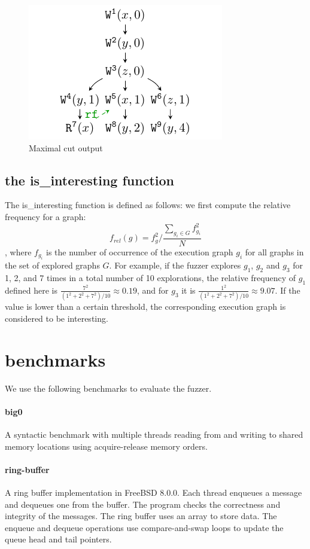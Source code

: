 \begin{figure}[htbp] 
	\centering
	\includegraphics[scale=1]{figure/cuts/cut-maximal.pdf} 
	\caption{Maximal cut output} 
	\label{cut:maximal} 
\end{figure} 


\subsection{the is\_interesting function}
The is\_interesting function is defined as follows: we first compute the relative frequency for a graph:
\[f_{rel}(g) = f_g^2 / \frac{\sum_{g_i \in G} f_{g_i}^2}{N}\], where $f_{g_i}$ is the number of occurrence of the execution graph $g_i$ for all graphs in the set of explored graphs $G$. For example, if the fuzzer explores $g_1$, $g_2$ and $g_3$ for 1, 2, and 7 times in a total number of 10 explorations, the relative frequency of $g_1$ defined here is $\frac{7^2}{(1^2 + 2^2 + 7^2) / 10} \approx 0.19 $, and for $g_3$ it is $\frac{1^2}{(1^2 + 2^2 + 7^2) / 10} \approx 9.07 $. If the value is lower than a certain threshold, the corresponding execution graph is considered to be interesting. 



\section{benchmarks}

We use the following benchmarks to evaluate the fuzzer.

\paragraph{big0} A syntactic benchmark with multiple threads reading from and writing to shared memory locations using acquire-release memory orders.

\paragraph{ring-buffer} A ring buffer implementation in FreeBSD 8.0.0. Each thread enqueues a message and dequeues one from the buffer. The program checks the correctness and integrity of the messages. The ring buffer uses an array to store data. The enqueue and dequeue operations use compare-and-swap loops to update the queue head and tail pointers.

